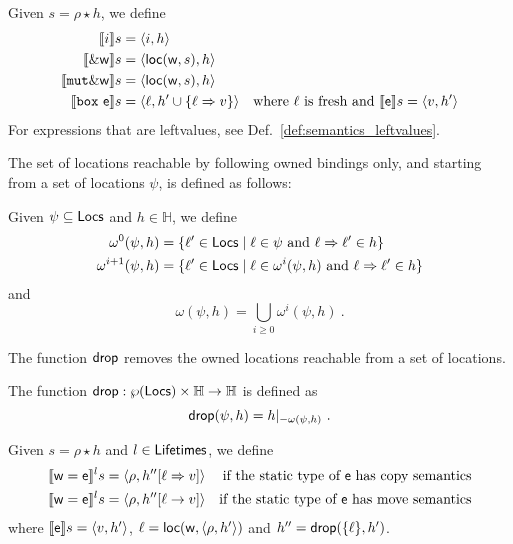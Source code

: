 \begin{definition}\label{def:semantics_expressions}
  Given $s=\rho\star h$, we define
  \begin{align*}
    \den[i]{s}&=\langle i,h\rangle\\
    \den[\borrow\mathsf{w}]{s}&=\langle\loc(\mathsf{w},s),h\rangle\\
    \den[\mathtt{mut}\borrow\mathsf{w}]{s}&=\langle\loc(\mathsf{w},s),h\rangle\\
    \den[\mathtt{box}\ \mathsf{e}]{s}&=\langle\ell,h'\cup\{\ell\Rightarrow v\}\rangle
    & \text{where $\ell$ is fresh and $\den[\mathsf{e}]{s}=\langle v, h'\rangle$}
  \end{align*}
  For expressions that are leftvalues, see Def.~\ref{def:semantics_leftvalues}.
\end{definition}

The set of locations reachable by following owned bindings only, and starting from a set of locations $\psi$,
is defined as follows:
%
\begin{definition}
  Given $\psi\subseteq\Locs$ and $h\in\mathbb{H}$, we define
  \begin{align*}
  \omega^0(\psi,h)&=\{\ell'\in\Locs\mid\ell\in\psi\text{ and }\ell\Rightarrow\ell'\in h\}\\
  \omega^{i+1}(\psi,h)&=\{\ell'\in\Locs\mid\ell\in\omega^i(\psi,h)\text{ and }\ell\Rightarrow\ell'\in h\}
  \end{align*}
  and
  \[
  \omega(\psi,h)=\bigcup\limits_{i\ge 0}\omega^i(\psi,h)~.
  \]
\end{definition}

The function $\drop$ removes the owned locations reachable from a set of locations.
%
\begin{definition}[Drop]\label{def:drop}
  The function $\drop:\wp(\Locs)\times\mathbb{H}\to\mathbb{H}$ is defined as
  \[
  \drop(\psi,h)=h|_{-{\omega(\psi,h)}}~.
  \]
\end{definition}

\begin{definition}\label{def:semantics_assigmment}
  Given $s=\rho\star h$ and $l\in\Lifetimes$, we define
  \begin{align*}
    \denl[\mathsf{w}=\mathsf{e}]{l}{s}&=\langle\rho,h''[\ell\Rightarrow v]\rangle & \text{if the static type of $\mathsf{e}$ has copy semantics}\\
    \denl[\mathsf{w}=\mathsf{e}]{l}{s}&=\langle\rho,h''[\ell\to v]\rangle & \text{if the static type of $\mathsf{e}$ has move semantics}
  \end{align*}
  where $\den[\mathsf{e}]{s}=\langle v,h'\rangle$, $\ell=\loc(\mathsf{w},\langle\rho,h'\rangle)$ and
  $h''=\drop(\{\ell\},h')$.
\end{definition}

